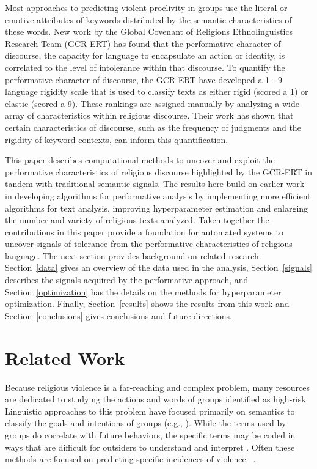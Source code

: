 \documentclass[11pt, a4paper]{article}
\begin{document}
Most approaches to predicting violent proclivity in groups use the literal or emotive attributes of keywords distributed by the semantic characteristics of these words. New work by  the Global Covenant of Religions Ethnolinguistics Research Team (GCR-ERT) has found that the performative character of discourse, the capacity for language to encapsulate an action or identity, is correlated to the level of intolerance within that discourse. To quantify the performative character of discourse, the GCR-ERT have developed a 1 - 9 language rigidity scale that is used to classify texts as either rigid (scored a 1) or elastic (scored a 9). These rankings are assigned manually by analyzing a wide array of characteristics within religious discourse.  Their work has shown that certain characteristics of discourse, such as the frequency of judgments and the rigidity of keyword contexts, can inform this quantification. 

This paper describes computational methods to uncover and exploit the performative characteristics of religious discourse highlighted by the GCR-ERT in tandem with traditional semantic signals.  The results here build on earlier work in developing algorithms for performative analysis by implementing more efficient algorithms for text analysis,  improving hyperparameter estimation and enlarging the number and variety of religious texts analyzed. Taken together the contributions in this paper provide a foundation for automated systems to uncover signals of tolerance from the performative characteristics of religious language. The next section provides background on related research. Section~\ref{data} gives an overview of the data used in the analysis, Section~\ref{signals} describes the signals acquired by the performative approach, and Section~\ref{optimization} has the details on the methods for hyperparameter optimization. Finally, Section~\ref{results} shows the results from this work and Section~\ref{conclusions} gives conclusions and future directions.  

\section{Related Work}\label{relatedwork}

Because religious violence is a far-reaching and complex problem, many resources are dedicated to studying the actions and words of groups identified as high-risk. Linguistic approaches to this problem have focused primarily on semantics to classify the goals and intentions of groups (e.g., ). While the terms used by groups do correlate with future behaviors, the specific terms may be coded in ways that are difficult for outsiders to understand and interpret \cite{hassner2009}. Often these methods are focused on predicting specific incidences of violence ~\cite{Yang2010}.
\end{document}
